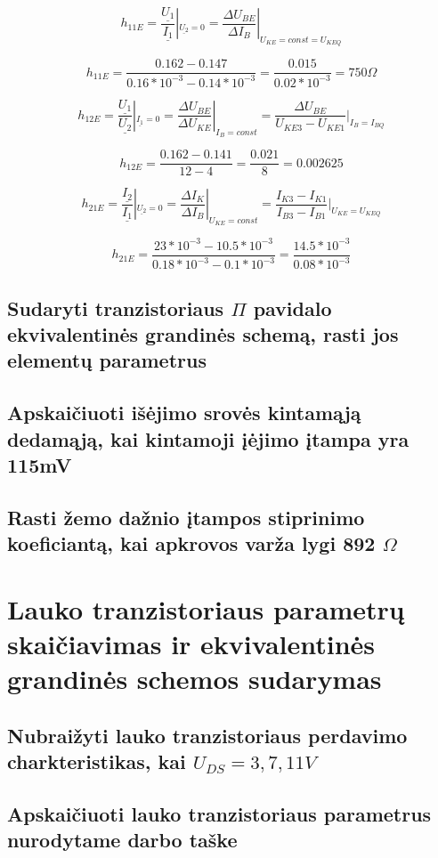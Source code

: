 \documentclass[11pt,a4paper]{article}
\begin{document}
\[
h_{11E} = \frac{\underline{U_1}}{\underline{I_1}}|_{\underline{U_2} = 0}
= \frac{\Delta U_{BE}}{\Delta I_B}|_{U_{KE} = const = U_{KEQ}}
\]

\[
h_{11E} = \frac{0.162-0.147}{0.16*10^{-3}-0.14*10^{-3}} = \frac{0.015}{0.02*10^{-3}} = 750 \Omega
\]

\[
h_{12E} = \frac{\underline{U_{1}}}{\underline{U_{2}}}|_{\underline{I_{1}} = 0} = \frac{\Delta U_{BE}}{\Delta U_{KE}}|_{I_{B} = const} = \frac{\Delta U_{BE}}{U_{KE3} - U_{KE1}} |_{I_B = I_{BQ}}
\]

\[
h_{12E} = \frac{0.162-0.141}{12-4} = \frac{0.021}{8} = 0.002625
\]

\[
h_{21E} = \frac{\underline{I_2}}{\underline{I_1}} |_{\underline{U_{2}} = 0} = 
\frac{\Delta I_{K}}{\Delta I_{B}} |_{U_{KE} = const} = 
\frac{I_{K3} - I_{K1}}{I_{B3} - I_{B1}} |_{U_{KE} = U_{KEQ}}
\]

\[
h_{21E} = \frac{23*10^{-3}-10.5*10^{-3}}{0.18*10^{-3}-0.1*10^{-3}} = \frac{14.5*10^{-3}}{0.08*10^{-3}}
\]

\subsection{Sudaryti tranzistoriaus $\Pi$ pavidalo ekvivalentinės grandinės schemą, rasti jos elementų parametrus}
\subsection{Apskaičiuoti išėjimo srovės kintamąją dedamąją, kai kintamoji įėjimo įtampa yra 115mV}
\subsection{Rasti žemo dažnio įtampos stiprinimo koeficiantą, kai apkrovos varža lygi 892 $\Omega$ }

\section{Lauko tranzistoriaus parametrų skaičiavimas ir ekvivalentinės grandinės schemos sudarymas}
\subsection{Nubraižyti lauko tranzistoriaus perdavimo charkteristikas, kai $U_{DS} = 3,7,11 V$}
\subsection{Apskaičiuoti lauko tranzistoriaus parametrus nurodytame darbo taške}
\end{document}
